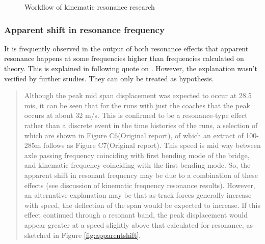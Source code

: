 \begin{figure}[h]
\centering
{}
\caption{Workflow of kinematic resonance research}
\label{fig:workflow329kinematic}
\end{figure}

\subsubsection{Apparent shift in resonance frequency}\label{sec:apparentshift}
It is frequently observed in the output of both resonance effects that apparent resonance happens at some frequencies higher than frequencies calculated on theory. This is explained in following quote on \cite[Page 13, Secondary Phase]{d181dt329}. However, the explanation wasn't verified by further studies. They can only be treated as hypothesis.

\begin{quote}
Although the peak mid span displacement was expected to occur at 28.5 mis, it can be seen that for the runs with just the coaches that the peak occurs at about 32 m/s. This is confirmed to be a resonance-type effect rather than a discrete event in the time histories of the runs, a selection of which are shown in Figure C6(Original report), of which an extract of 100-285m follows as Figure C7(Original report). This speed is mid way between axle passing frequency coinciding with first bending mode of the bridge, and kinematic frequency coinciding with the first bending mode. So, the apparent shift in resonant frequency may be due to a combination of these effects (see discussion of kinematic frequency resonance results). However, an alternative explanation may be that as track forces generally increase with speed, the deflection of the span would be expected to increase. If this effect continued through a resonant band, the peak displacement would appear greater at a speed slightly above that calculated for resonance, as sketched in Figure \ref{fig:apparentshift}.
\end{quote}

